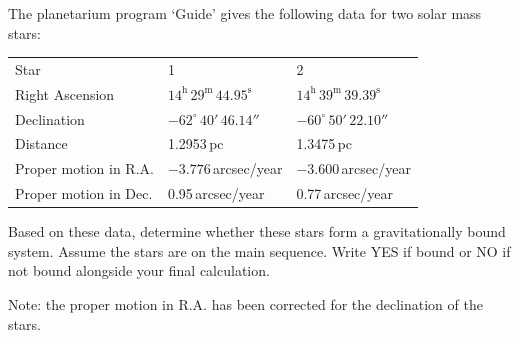 The planetarium program `Guide' gives the following data for two solar mass
stars:

\begin{center}
\begin{tabular}{lll}
Star & 1 & 2 \\
Right Ascension & $14^\mathrm{h}\,29^\mathrm{m}\,44.95^\mathrm{s}$
  & $14^\mathrm{h}\,39^\mathrm{m}\,39.39^\mathrm{s}$ \\
Declination & $-62^\circ\,40'\,46.14''$ & $-60^\circ\,50'\,22.10''$ \\
Distance & 1.2953\,pc & 1.3475\,pc \\
Proper motion in R.A. & $-3.776$\,arcsec/year & $-3.600$\,arcsec/year \\
Proper motion in Dec. & 0.95\,arcsec/year & 0.77\,arcsec/year \\
\end{tabular}
\end{center}

Based on these data, determine whether these stars form a gravitationally
bound system. Assume the stars are on the main sequence. Write YES if bound
or NO if not bound alongside your final calculation.

Note: the proper motion in R.A. has been corrected for the declination of
the stars.
